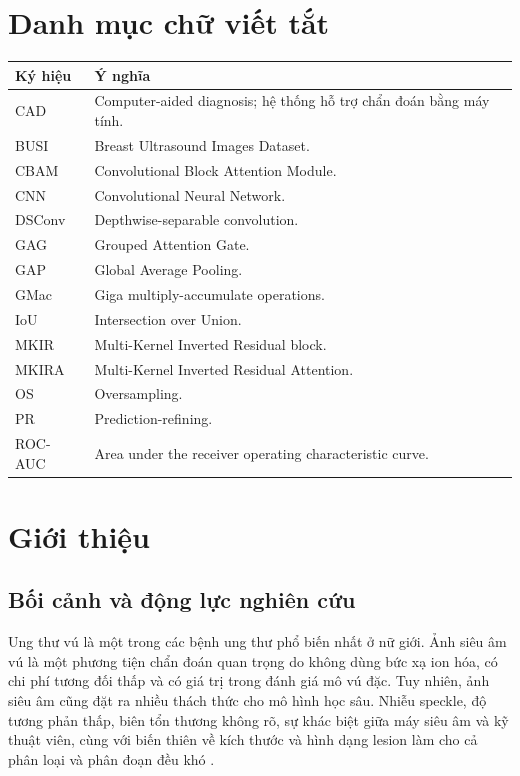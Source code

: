 \documentclass[12pt,a4paper,oneside]{report}
\begin{document}
\clearpage
\tableofcontents
\clearpage
\listoffigures
\clearpage
\listoftables
\clearpage

\chapter*{Danh mục chữ viết tắt}
\begin{longtable}{p{3cm}p{11cm}}
\toprule
\textbf{Ký hiệu} & \textbf{Ý nghĩa} \\
\midrule
CAD & Computer-aided diagnosis; hệ thống hỗ trợ chẩn đoán bằng máy tính. \\
BUSI & Breast Ultrasound Images Dataset. \\
CBAM & Convolutional Block Attention Module. \\
CNN & Convolutional Neural Network. \\
DSConv & Depthwise-separable convolution. \\
GAG & Grouped Attention Gate. \\
GAP & Global Average Pooling. \\
GMac & Giga multiply-accumulate operations. \\
IoU & Intersection over Union. \\
MKIR & Multi-Kernel Inverted Residual block. \\
MKIRA & Multi-Kernel Inverted Residual Attention. \\
OS & Oversampling. \\
PR & Prediction-refining. \\
ROC-AUC & Area under the receiver operating characteristic curve. \\
\bottomrule
\end{longtable}

\clearpage
{}

\chapter{Giới thiệu}

\section{Bối cảnh và động lực nghiên cứu}

Ung thư vú là một trong các bệnh ung thư phổ biến nhất ở nữ giới. Ảnh siêu âm vú là một phương tiện chẩn đoán quan trọng do không dùng bức xạ ion hóa, có chi phí tương đối thấp và có giá trị trong đánh giá mô vú đặc. Tuy nhiên, ảnh siêu âm cũng đặt ra nhiều thách thức cho mô hình học sâu. Nhiễu speckle, độ tương phản thấp, biên tổn thương không rõ, sự khác biệt giữa máy siêu âm và kỹ thuật viên, cùng với biến thiên về kích thước và hình dạng lesion làm cho cả phân loại và phân đoạn đều khó \citep{globocan,busi,aumente}.
\end{document}

